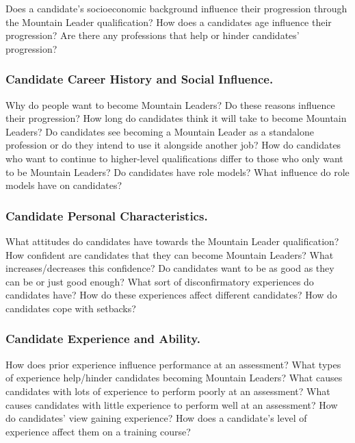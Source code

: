 \documentclass[
  12pt,
  a4paper,
]{book}
\begin{document}
Does a candidate's socioeconomic background influence their progression through the Mountain Leader qualification? How does a candidates age influence their progression? Are there any professions that help or hinder candidates' progression?

\hypertarget{candidate-career-history-and-social-influence.}{%
\subsubsection{Candidate Career History and Social Influence.}\label{candidate-career-history-and-social-influence.}}

Why do people want to become Mountain Leaders? Do these reasons influence their progression? How long do candidates think it will take to become Mountain Leaders? Do candidates see becoming a Mountain Leader as a standalone profession or do they intend to use it alongside another job? How do candidates who want to continue to higher-level qualifications differ to those who only want to be Mountain Leaders? Do candidates have role models? What influence do role models have on candidates?

\hypertarget{candidate-personal-characteristics.}{%
\subsubsection{Candidate Personal Characteristics.}\label{candidate-personal-characteristics.}}

What attitudes do candidates have towards the Mountain Leader qualification? How confident are candidates that they can become Mountain Leaders? What increases/decreases this confidence? Do candidates want to be as good as they can be or just good enough? What sort of disconfirmatory experiences do candidates have? How do these experiences affect different candidates? How do candidates cope with setbacks?

\hypertarget{candidate-experience-and-ability.}{%
\subsubsection{Candidate Experience and Ability.}\label{candidate-experience-and-ability.}}

How does prior experience influence performance at an assessment? What types of experience help/hinder candidates becoming Mountain Leaders? What causes candidates with lots of experience to perform poorly at an assessment? What causes candidates with little experience to perform well at an assessment? How do candidates' view gaining experience? How does a candidate's level of experience affect them on a training course?
\end{document}
